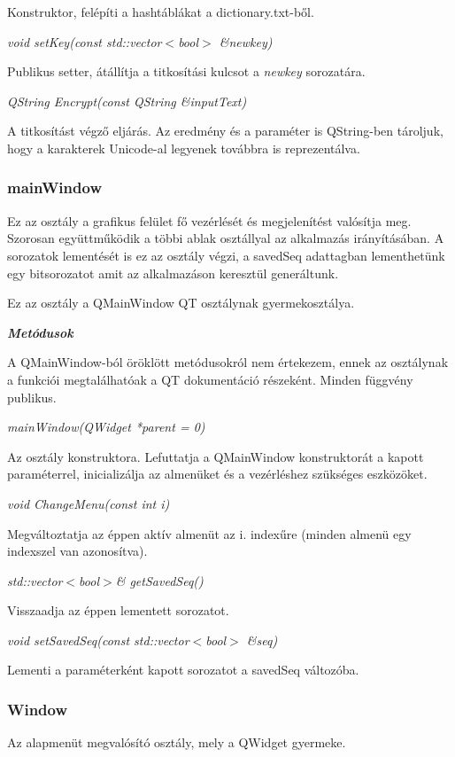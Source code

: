 \documentclass[hidelinks, 12pt]{article}
\begin{document}
Konstruktor, felépíti a hashtáblákat a dictionary.txt-ből.

\textit{void setKey(const std::vector$<$bool$>$ \&newkey)}

Publikus setter, átállítja a titkosítási kulcsot a \textit{newkey} sorozatára.

\textit{QString Encrypt(const QString \&inputText)}

A titkosítást végző eljárás. Az eredmény és a paraméter is QString-ben tároljuk, hogy a karakterek Unicode-al legyenek továbbra is reprezentálva.
\subsubsection*{mainWindow}
Ez az osztály a grafikus felület fő vezérlését és megjelenítést valósítja meg. Szorosan együttműködik a többi ablak osztállyal az alkalmazás irányításában. A sorozatok lementését is ez az osztály végzi, a savedSeq adattagban lementhetünk egy bitsorozatot amit az alkalmazáson keresztül generáltunk.

Ez az osztály a QMainWindow QT osztálynak gyermekosztálya.

\textit{\textbf{Metódusok}}

A QMainWindow-ból öröklött metódusokról nem értekezem, ennek az osztálynak a funkciói megtalálhatóak a QT dokumentáció részeként. Minden függvény publikus.

\textit{mainWindow(QWidget *parent = 0)}

Az osztály konstruktora. Lefuttatja a QMainWindow konstruktorát a kapott paraméterrel, inicializálja az almenüket és a vezérléshez szükséges eszközöket.

\textit{void ChangeMenu(const int i)}

Megváltoztatja az éppen aktív almenüt az i. indexűre (minden almenü egy indexszel van azonosítva).

\textit{std::vector$<$bool$>$\& getSavedSeq()}

Visszaadja az éppen lementett sorozatot.

\textit{void setSavedSeq(const std::vector$<$bool$>$ \&seq)}

Lementi a paraméterként kapott sorozatot a savedSeq változóba.

\subsubsection*{Window}
Az alapmenüt megvalósító osztály, mely a QWidget gyermeke.
\end{document}
